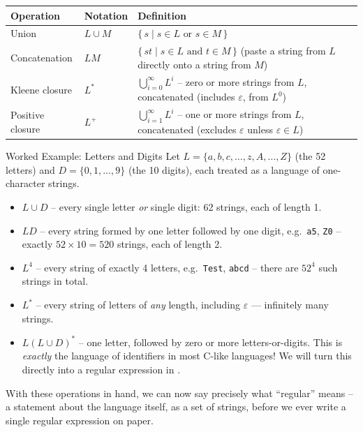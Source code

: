 \documentclass[full-course-notes.tex]{subfiles}
\begin{document}
\begin{center}
\renewcommand{\arraystretch}{1.35}
\begin{tabularx}{\textwidth}{@{}l l X@{}}
\toprule
\textbf{Operation} & \textbf{Notation} & \textbf{Definition} \\
\midrule
Union & $L \cup M$ & $\{\, s \mid s \in L \text{ or } s \in M \,\}$ \\
Concatenation & $LM$ & $\{\, st \mid s \in L \text{ and } t \in M \,\}$ (paste a string from $L$
directly onto a string from $M$) \\
Kleene closure & $L^{*}$ & $\bigcup_{i=0}^{\infty} L^{i}$ -- zero or more strings from $L$,
concatenated (includes $\varepsilon$, from $L^0$) \\
Positive closure & $L^{+}$ & $\bigcup_{i=1}^{\infty} L^{i}$ -- one or more strings from $L$,
concatenated (excludes $\varepsilon$ unless $\varepsilon \in L$) \\
\bottomrule
\end{tabularx}
\end{center}

\begin{examplebox}{Worked Example: Letters and Digits}
Let $L = \{a, b, c, \dots, z, A, \dots, Z\}$ (the 52 letters) and $D = \{0, 1, \dots, 9\}$ (the
10 digits), each treated as a language of one-character strings.
\begin{itemize}
  \item $L \cup D$ -- every single letter \emph{or} single digit: 62 strings, each of length 1.
  \item $LD$ -- every string formed by one letter followed by one digit, e.g.\ \texttt{a5},
  \texttt{Z0} -- exactly $52 \times 10 = 520$ strings, each of length 2.
  \item $L^{4}$ -- every string of exactly 4 letters, e.g.\ \texttt{Test}, \texttt{abcd} --
  there are $52^{4}$ such strings in total.
  \item $L^{*}$ -- every string of letters of \emph{any} length, including $\varepsilon$ ---
  infinitely many strings.
  \item $L(L \cup D)^{*}$ -- one letter, followed by zero or more letters-or-digits. This is
  \emph{exactly} the language of identifiers in most C-like languages! We will turn this
  directly into a regular expression in .
\end{itemize}
\end{examplebox}

\dbtag With these operations in hand, we can now say precisely what ``regular'' means -- a
statement about the language itself, as a set of strings, before we ever write a single regular
expression on paper.
\end{document}
